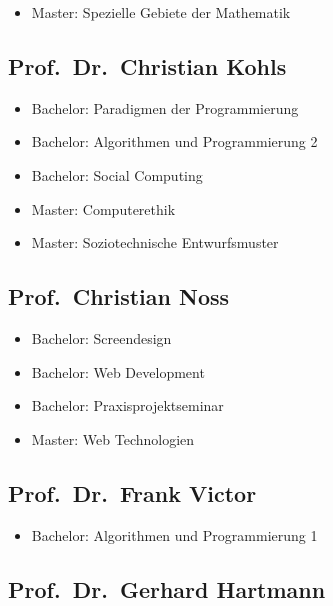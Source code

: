 \begin{itemize}
\tightlist
\item
  Master: Spezielle Gebiete der Mathematik
\end{itemize}

\subsection{Prof.~Dr.~Christian Kohls}\label{prof.dr.christian-kohls}

\begin{itemize}
\tightlist
\item
  Bachelor: Paradigmen der Programmierung
\item
  Bachelor: Algorithmen und Programmierung 2
\item
  Bachelor: Social Computing
\item
  Master: Computerethik
\item
  Master: Soziotechnische Entwurfsmuster
\end{itemize}

\subsection{Prof.~Christian Noss}\label{prof.christian-noss}

\begin{itemize}
\tightlist
\item
  Bachelor: Screendesign
\item
  Bachelor: Web Development
\item
  Bachelor: Praxisprojektseminar
\item
  Master: Web Technologien
\end{itemize}

\subsection{Prof.~Dr.~Frank Victor}\label{prof.dr.frank-victor}

\begin{itemize}
\tightlist
\item
  Bachelor: Algorithmen und Programmierung 1
\end{itemize}

\subsection{Prof.~Dr.~Gerhard
Hartmann}\label{prof.dr.gerhard-hartmann}

